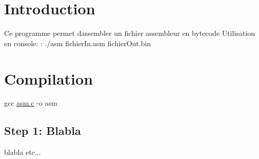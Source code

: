\hypertarget{index_intro_sec}{}\section{Introduction}\label{index_intro_sec}
Ce programme permet d\textquotesingle{}assembler un fichier assembleur en bytecode Utilisation en console\+: \+: ./asm fichier\+In.\+asm fichier\+Out.\+bin\hypertarget{index_Compilation}{}\section{Compilation}\label{index_Compilation}
gcc \hyperlink{asm_8c}{asm.\+c} -\/o asm\hypertarget{index_step1}{}\subsection{Step 1\+: Blabla}\label{index_step1}
blabla etc... 